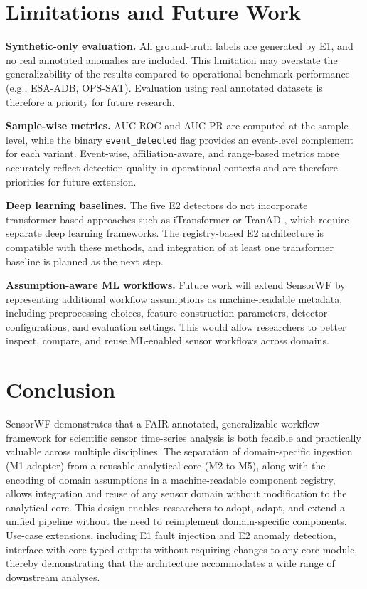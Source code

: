 \documentclass[conference]{IEEEtran}
\begin{document}
\section{Limitations and Future Work}
\label{sec:limitations}

\textbf{Synthetic-only evaluation.} All ground-truth labels are generated by E1, and no real annotated anomalies are included. This limitation may overstate the generalizability of the results compared to operational benchmark performance (e.g., ESA-ADB, OPS-SAT). Evaluation using real annotated datasets is therefore a priority for future research.

\textbf{Sample-wise metrics.} AUC-ROC and AUC-PR are computed at the sample level, while the binary \texttt{event\_detected} flag provides an event-level complement for each variant. Event-wise, affiliation-aware, and range-based metrics \cite{esa_adb2024} more accurately reflect detection quality in operational contexts and are therefore priorities for future extension.

\textbf{Deep learning baselines.} The five E2 detectors do not incorporate transformer-based approaches such as iTransformer \cite{itransformer2024} or TranAD \cite{tuli2022tranad}, which require separate deep learning frameworks. The registry-based E2 architecture is compatible with these methods, and integration of at least one transformer baseline is planned as the next step.

\textbf{Assumption-aware ML workflows.} Future work will extend SensorWF by representing additional workflow assumptions as machine-readable metadata, including preprocessing choices,
feature-construction parameters, detector configurations, and evaluation
settings. This would allow researchers to better inspect, compare, and
reuse ML-enabled sensor workflows across domains.


\section{Conclusion}

SensorWF demonstrates that a FAIR-annotated, generalizable workflow framework for scientific sensor time-series analysis is both feasible and practically valuable across multiple disciplines. The separation of domain-specific ingestion (M1 adapter) from a reusable analytical core (M2 to M5), along with the encoding of domain assumptions in a machine-readable component registry, allows integration and reuse of any sensor domain without modification to the analytical core. This design enables researchers to adopt, adapt, and extend a unified pipeline without the need to reimplement domain-specific components. Use-case extensions, including E1 fault injection and E2 anomaly detection, interface with core typed outputs without requiring changes to any core module, thereby demonstrating that the architecture accommodates a wide range of downstream analyses.
\end{document}
